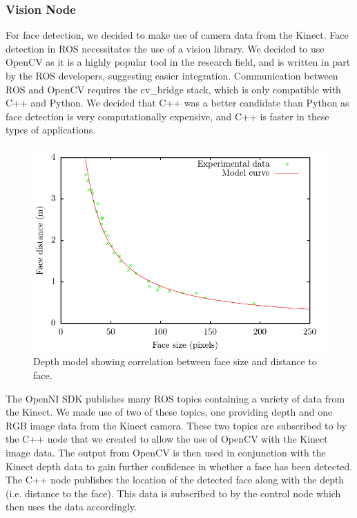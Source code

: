 \documentclass[conference]{IEEEtran}
\begin{document}
\subsubsection{Vision Node}
For face detection, we decided to make use of camera data from the Kinect. Face detection in ROS necessitates the use of a vision library. We decided to use OpenCV as it is a highly popular tool in the research field, and is written in part by the ROS developers, suggesting easier integration. Communication between ROS and OpenCV requires the cv\_bridge stack, which is only compatible with C++ and Python. We decided that C++ was a better candidate than Python as face detection is very computationally expensive, and C++ is faster in these types of applications.
\begin{figure}[h]
  \includegraphics[width=\columnwidth]{centre_model}
  \caption{Depth model showing correlation between face size and distance to face.}
  \label{fig:model}
\end{figure}
The OpenNI SDK publishes many ROS topics containing a variety of data from the Kinect. We made use of two of these topics, one providing depth and one RGB image data from the Kinect camera. These two topics are subscribed to by the C++ node that we created to allow the use of OpenCV with the Kinect image data. The output from OpenCV is then used in conjunction with the Kinect depth data to gain further confidence in whether a face has been detected. The C++ node publishes the location of the detected face along with the depth (i.e. distance to the face). This data is subscribed to by the control node which then uses the data accordingly.
\end{document}

